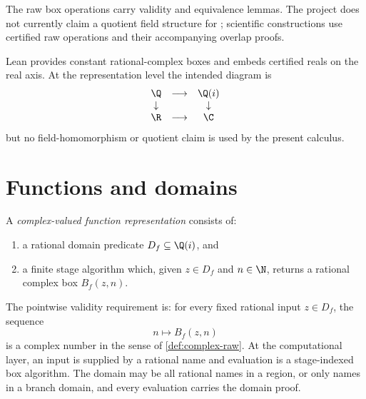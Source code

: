 \begin{proposition}\label{thm:complex-field}
The raw box operations carry validity and equivalence lemmas.  The project
does not currently claim a quotient field structure for ;
scientific constructions use certified raw operations and their accompanying
overlap proofs.
\end{proposition}

\begin{proposition}\label{thm:rational-complex-field-square}
Lean provides constant rational-complex boxes and embeds certified reals on the
real axis.  At the representation level the intended diagram is
\[
\begin{array}{ccc}
\Q & \longrightarrow & \Q(i)\\
\downarrow & & \downarrow\\
\R & \longrightarrow & \C
\end{array}
\]
but no field-homomorphism or quotient claim is used by the present calculus.
\end{proposition}

\section{Functions and domains}

\begin{definition}\label{def:function-raw}
A \emph{complex-valued function representation} consists of:
\begin{enumerate}
  \item a rational domain predicate \(D_f\subseteq\Q(i)\), and
  \item a finite stage algorithm which, given \(z\in D_f\) and \(n\in\N\),
  returns a rational complex box \(B_f(z,n)\).
\end{enumerate}
The pointwise validity requirement is:
for every fixed rational input \(z\in D_f\), the sequence
\[
  n\longmapsto B_f(z,n)
\]
is a complex number in the sense of \cref{def:complex-raw}.  At the
computational layer, an input is supplied by a rational name and evaluation is
a stage-indexed box algorithm.  The domain may be all rational names in a
region, or only names in a branch domain, and every evaluation carries the
domain proof.
\end{definition}

